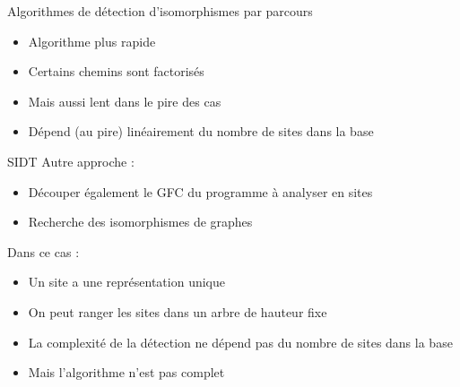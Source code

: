\documentclass{beamer}
\begin{document}
\begin{frame}{Algorithmes de détection d'isomorphismes par parcours}
\begin{minipage}{.5\textwidth}
\begin{center}
{
}
\end{center}
\end{minipage}
\begin{minipage}{.4\textwidth}
 \begin{itemize}
  \item Algorithme plus rapide
  \item Certains chemins sont factorisés
  \item Mais aussi lent dans le pire des cas
  \item Dépend (au pire) linéairement du nombre de sites dans la base
 \end{itemize}
\end{minipage}
\end{frame}


\begin{frame}{SIDT}
Autre approche :
 \begin{itemize}
  \item Découper également le GFC du programme à analyser en sites
  \item Recherche des isomorphismes de graphes
 \end{itemize}
Dans ce cas :
\begin{itemize}
 \item Un site a une représentation unique
 \item On peut ranger les sites dans un arbre de hauteur fixe
 \item La complexité de la détection ne dépend pas du nombre de sites dans la base
 \item Mais l'algorithme n'est pas complet
\end{itemize}
\end{frame}
\end{document}
